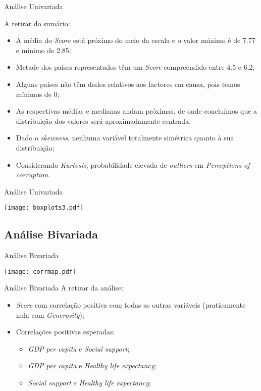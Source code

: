 \documentclass[xcolor=dvipsnames,table]{beamer}
\begin{document}
	\begin{frame}{Análise Univariada}
		
	A retirar do sumário:
	
	\begin{itemize}
	    \item A média do \textit{Score} está próximo do meio da escala e o valor máximo é de 7.77 e
mínimo de 2.85;
        \item Metade dos países representados têm um \textit{Score} compreendido entre 4.5 e 6.2;
        \item Alguns países não têm dados relativos aos factores em causa, pois temos mínimos
de 0;
        \item As respectivas médias e medianas andam próximas, de onde concluímos que a distribuição dos valores será aproximadamente centrada.
        \item Dado o \textit{skewness}, nenhuma variável totalmente simétrica quanto à sua distribuição;
        \item Considerando \textit{Kurtosis}, probabilidade elevada de \textit{outliers} em \textit{Perceptions of corruption}.
	\end{itemize}
		
	\end{frame}
	
	\begin{frame}{Análise Univariada}
	    \begin{center}
    	\texttt{[image: boxplots3.pdf]}
  		\end{center}
	\end{frame}
	
	
	\subsection{Análise Bivariada}
	
	\begin{frame}{Análise Bivariada}
	    \begin{center}
    	\texttt{[image: corrmap.pdf]}
  		\end{center}
	\end{frame}
	
	\begin{frame}{Análise Bivariada}
	A retirar da análise:
	    \begin{itemize}
	        \item \textit{Score} com correlação positiva com todas as outras variáveis (praticamente nula com \textit{Generosity});
	        \item Correlações positivas esperadas:
	            \begin{itemize}
	                \item \textit{GDP per capita} e \textit{Social support};
	                \item \textit{GDP per capita} e \textit{Healthy life expectancy};
	                \item \textit{Social support} e \textit{Healthy life expectancy};
	            \end{itemize}
	    \end{itemize}
	\end{frame}
	
\end{document}
